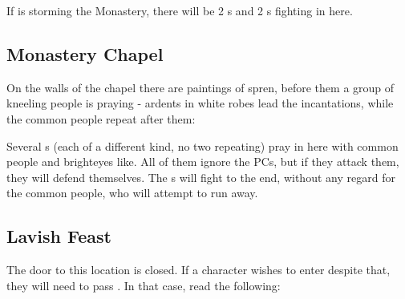 If \npcHighmarshal{} is storming the Monastery, there will be 2 \enemyCultist{}s and 2 \enemyWallGuard{}s fighting in here.



\subsection{Monastery Chapel}
\label{sec:monasteryChapel}

On the walls of the chapel there are paintings of spren, before them a group of kneeling people is praying - ardents in white robes lead the incantations, while the common people repeat after them:


Several \enemyCultist{}s (each \enemyCultistOfMoments{} of a different kind, no two repeating) pray in here with common people and brighteyes like. All of them ignore the PCs, but if they attack them, they will defend themselves. The \enemyCultist{}s will fight to the end, without any regard for the common people, who will attempt to run away.




\subsection{Lavish Feast}
\label{sec:monasteryFeast}

The door to this location is closed. If a character wishes to enter despite that, they will need to pass . In that case, read the following:


